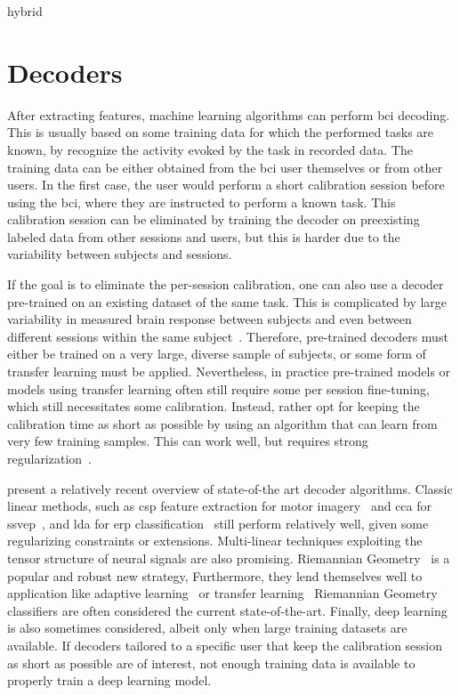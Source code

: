 hybrid

\section{Decoders}
\label{sec:bci-decoders}

After extracting features, machine learning algorithms can perform \ac{bci}
decoding.
This is usually based on
some training data for which the performed tasks are known, by recognize the
activity evoked by the task in recorded data.
The training data can be either obtained from the \ac{bci} user themselves or from
other users.
In the first case, the user would perform a short calibration session before
using the \ac{bci}, where they are instructed to perform a known task.
This calibration session can be eliminated by training the decoder on
preexisting labeled data from other sessions and users, but this is harder due
to the variability between subjects and sessions.


If the goal is to eliminate the per-session calibration, one can also use a
decoder pre-trained on an existing dataset of the same task.
This is complicated by large variability in measured brain response between subjects
and even between different sessions within the same
subject~\cite{Guger2009,Saha2020}.
Therefore, pre-trained decoders must either be trained on a very large, diverse
sample of subjects, or some form of transfer learning must be applied.
Nevertheless, in practice pre-trained models or models using transfer learning often still
require some per session fine-tuning, which still necessitates some
calibration.
Instead, rather opt for keeping the calibration time as short as possible by using
an algorithm that can learn from very few training samples.
This can work well, but requires strong regularization~\cite{VanDenKerchove2022}.

\textcite{Lotte2018, Xu2021} present a relatively recent overview of state-of-the art
decoder algorithms.
Classic linear methods, such as \ac{csp} feature extraction for
motor imagery~\cite{Park2017} and \ac{cca} for \ac{ssvep}~\cite{Nakanishi2017},
and \ac{lda} for \ac{erp} classification~\cite{Sosulski2022} still perform
relatively well, given some regularizing constraints or extensions.
Multi-linear techniques exploiting the tensor structure of neural signals are
also promising.
Riemannian Geometry~\cite{Barachant2014} is a popular and robust new strategy,
Furthermore, they lend themselves well to application like adaptive
learning~\cite{Benaroch2021} or transfer learning~\cite{Zanini2017}
Riemannian Geometry classifiers are often considered the current
state-of-the-art.
Finally, deep learning is also sometimes considered, albeit only when large
training datasets are available.
If decoders tailored to a specific user that keep the calibration session as
short as possible are of interest, not enough training data is available to
properly train a deep learning model.

